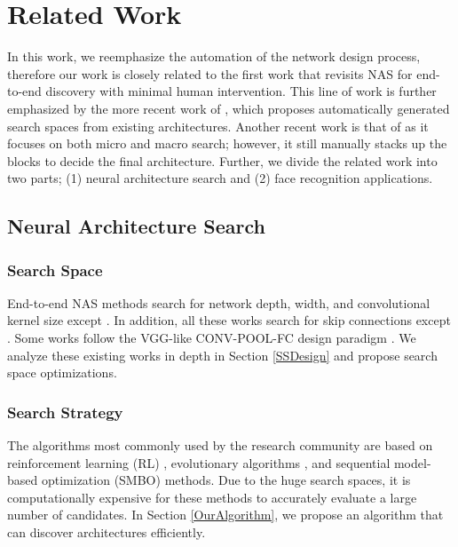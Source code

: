 \section{Related Work}
In this work, we reemphasize the automation of the network design process, therefore our work is closely related to the first work \cite{Macro} that revisits NAS for end-to-end discovery with minimal human intervention. This line of work is further emphasized by the more recent work of \cite{Macro-Neural}, which proposes automatically generated search spaces from existing architectures. Another recent work is that of \cite{AGNAS} as it focuses on both micro and macro search; however, it still manually stacks up the blocks to decide the final architecture. Further, we divide the related work into two parts; (1) neural architecture search and (2) face recognition applications.
 

\subsection{Neural Architecture Search}


\subsubsection{Search Space} End-to-end NAS methods search for network depth, width, and convolutional kernel size \cite{zoph2016RL,MetaQNN,Real_evolution,NASH,EAS,NASBOT} except \cite{GeneticProgrammingCNN}. In addition, all these works search for skip connections except \cite{MetaQNN,EAS}. Some works follow the VGG-like CONV-POOL-FC design paradigm \cite{MetaQNN,EAS,NASBOT}. We analyze these existing works in depth in Section \ref{SSDesign} and propose search space optimizations.

 
\subsubsection{Search Strategy}

The algorithms most commonly used by the research community are based on reinforcement learning (RL) \cite{zoph2016RL,MetaQNN,EAS}, evolutionary algorithms \cite{Real_evolution,GeneticProgrammingCNN,NASH,Macro-Neural}, and sequential model-based optimization (SMBO) \cite{NASBOT,NSGA} methods. Due to the huge search spaces, it is computationally expensive for these methods to accurately evaluate a large number of candidates. In Section \ref{OurAlgorithm}, we propose an algorithm that can discover architectures efficiently.

